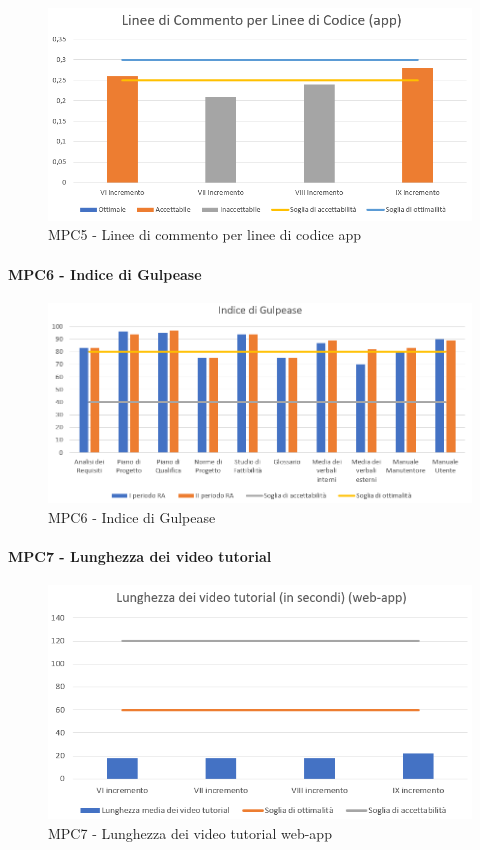   \begin{figure}[h!]
    \centering
      \includegraphics[scale=1]{Immagini/lineeCommLineeCod APPA.PNG}
    \caption{MPC5 - Linee di commento per linee di codice app}
  \end{figure}



  \clearpage
  \paragraph{MPC6 - Indice di Gulpease}
  \begin{figure}[h!]
    \centering
      \includegraphics[scale=1]{Immagini/IndGulpA.PNG}
    \caption{MPC6 - Indice di Gulpease}
  \end{figure}



  \clearpage
  \paragraph{MPC7 - Lunghezza dei video tutorial}
  \begin{figure}[h!]
    \centering
      \includegraphics[scale=1]{Immagini/lunghVideoTut WAA.PNG}
    \caption{MPC7 - Lunghezza dei video tutorial web-app}
  \end{figure}


